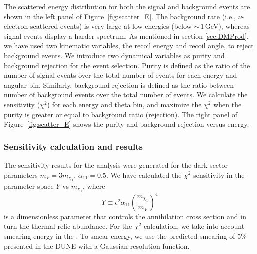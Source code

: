 The scattered energy distribution for both the signal and background events are shown in the left panel of Figure~\ref{fig:scatter_E}.
The background rate (i.e., $\nu$-electron scattered events) is very large at low energies (below $\sim\,1\,$GeV), whereas signal events display a harder spectrum. 
As mentioned in section \ref{sec:DMProd},  we have used two kinematic variables, the recoil energy and recoil angle, to reject background events. 
We introduce two dynamical variables as purity and background rejection for the event selection. 
Purity is defined as the ratio of the number of signal events over the total number of events for each energy and angular bin. 
Similarly, background rejection is defined as the ratio between number of background events over the total number of events. 
We calculate the sensitivity ($\chi^{2}$) for each energy and theta bin, and maximize the $\chi^{2}$ when the purity is greater or equal to background ratio (rejection). The right panel of Figure~\ref{fig:scatter_E} shows the purity and background rejection versus energy.

\subsubsection{Sensitivity calculation and results}
The sensitivity results for the analysis were generated for the dark sector parameters  $m_{V}=3m_{\chi_1}$, $\alpha_{11}=0.5$. 
We have calculated the $\chi^{2}$ sensitivity in the parameter space $Y$ vs $m_{\chi_1}$, where 
\begin{equation}
Y\equiv\epsilon^{2}\alpha_{11} (\frac{m_{\chi_1}}{m_{V}})^{4}
\end{equation}
is a dimensionless parameter that controls the  annihilation cross section and in turn the thermal relic abundance. 
For the $\chi^{2}$ calculation, we take into account smearing energy in the  .
To smear energy, we use the predicted smearing of 5$\%$ presented in the DUNE  \cite{Acciarri:2015uup} with a Gaussian resolution function.


